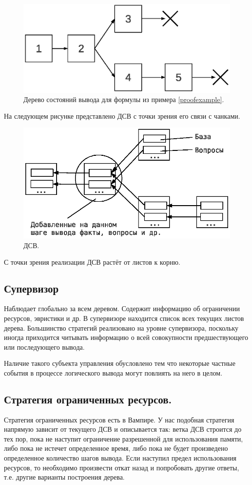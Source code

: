 \begin{figure}[h]
	\centering
	\includegraphics[width=0.4\linewidth]{pics/PST.eps}
	\caption{Дерево состояний вывода для формулы из примера \ref{proofexample}.}
	\label{fig:pst}
\end{figure}

На следующем рисунке представлено ДСВ с точки зрения его связи с чанками.

\begin{figure}[h]
	\centering
	\includegraphics[width=0.6\linewidth]{pics/PST2.eps}
	\caption{ДСВ.}
	\label{fig:pst2}
\end{figure}

С точки зрения реализации ДСВ растёт от листов к корню.



\subsection{Супервизор}
Наблюдает глобально за всем деревом. Содержит информацию об ограничении ресурсов, эвристики и др.
В супервизоре находится список всех текущих листов дерева.
Большинство стратегий реализовано на уровне супервизора, поскольку иногда приходится читывать информацию о всей совокупности предшествующего или последующего вывода.

Наличие такого субъекта управления обусловлено тем что некоторые частные события в процессе логического вывода могут повлиять на него в целом.

\subsection{Стратегия ограниченных ресурсов.}
Стратегия ограниченных ресурсов есть в Вампире. У нас подобная стратегия напрямую зависит от текущего ДСВ и описывается так: ветка ДСВ строится до тех пор, пока не наступит ограничение разрешенной для использования памяти, либо пока не истечет определенное время, либо пока не будет произведено определенное количество шагов вывода. Если наступил предел использования ресурсов, то необходимо произвести откат назад и попробовать другие ответы, т.е. другие варианты построения дерева.

